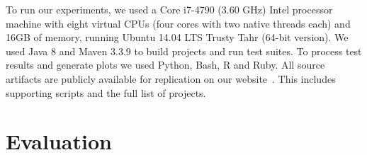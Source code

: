 \label{sec:setup}

To run our experiments, we used a Core i7-4790 (3.60 GHz) Intel
processor machine with eight virtual CPUs (four cores with two native
threads each) and 16GB of memory, running Ubuntu 14.04 LTS Trusty Tahr
(64-bit version).  We used Java 8 and Maven
3.3.9 to build projects and run test suites. To
process test results and generate plots
we used Python, Bash, R and Ruby.  All source artifacts are
publicly available for replication on our website~\cite{ourwebpage}.
This includes supporting scripts and the full list of projects.

\section{Evaluation}
\label{sec:eval}



